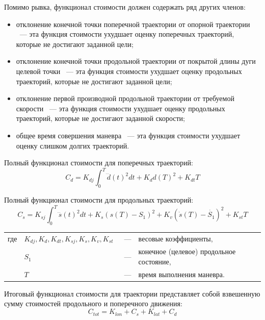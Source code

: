 Помимо рывка, функционал стоимости должен содержать ряд других членов:
\begin{itemize}
      \item отклонение конечной точки поперечной траектории от опорной траектории ~--- эта функция стоимости
            ухудшает оценку поперечных траекторий, которые не достигают заданной цели;
      \item отклонение конечной точки продольной траектории от покрытой длины дуги целевой точки ~--- эта функция
            стоимости ухудшает оценку продольных траекторий, которые не достигают заданной цели;
      \item отклонение первой производной продольной траектории от требуемой скорости ~--- эта функция стоимости
            ухудшает оценку продольных траекторий, которые не достигают заданной скорости;
      \item общее время совершения маневра ~--- эта функция стоимости ухудшает оценку слишком долгих траекторий.
\end{itemize}

Полный функционал стоимости для поперечных траекторий:
\begin{equation}
      \label{eq:cost_lat}
      C_d = K_{dj} \int_{0}^{T}{\dddot{d}(t)^2dt} + K_d d(T)^2 + K_{dt} T
\end{equation}

Полный функционал стоимости для продольных траекторий:
\begin{equation}
      \label{eq:cost_lon}
      C_s = K_{sj} \int_{0}^{T}{\dddot{s}(t)^2dt} + K_s (s(T) - S_1)^2 + K_v (\dot{s}(T) - \dot{S_1})^2 + K_{st} T
\end{equation}

\noindent\begin{tabularx}{\linewidth}{lllX}
      где & $K_{dj}, K_d, K_{dt}, K_{sj}, K_s, K_v, K_{st}$ &~---& весовые коэффициенты, \\
          & $S_1$                                           &~---& конечное (целевое) продольное состояние, \\
          & $T$                                             &~---& время выполнения маневра. \\
\end{tabularx}

Итоговый функционал стоимости для траектории представляет собой взвешенную сумму стоимостей продольного и
поперечного движения:
\begin{equation}
      \label{eq:cost_tot}
      C_{tot} = K_{lon} + C_s + K_{lat} + C_d
\end{equation}

